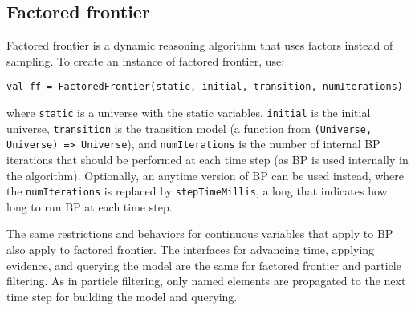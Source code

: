 \subsection{Factored frontier}

Factored frontier is a dynamic reasoning algorithm that uses factors instead of sampling. To create an instance of factored frontier, use:

\begin{flushleft}
\texttt{val ff = FactoredFrontier(static, initial, transition, numIterations)}
\end{flushleft}

where \texttt{static} is a universe with the static variables, \texttt{initial} is the initial universe, \texttt{transition} is the transition model (a function from \texttt{(Universe, Universe) => Universe}), and \texttt{numIterations} is the number of internal BP iterations that should be performed at each time step (as BP is used internally in the algorithm). Optionally, an anytime version of BP can be used instead, where the \texttt{numIterations} is replaced by \texttt{stepTimeMillis}, a long that indicates how long to run BP at each time step.

The same restrictions and behaviors for continuous variables that apply to BP also apply to factored frontier. The interfaces for advancing time, applying evidence, and querying the model are the same for factored frontier and particle filtering. As in particle filtering, only named elements are propagated to the next time step for building the model and querying.

